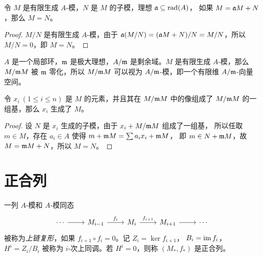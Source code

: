 \begin{corollary}\label{coro:Nakayama}
  令 $M$ 是有限生成 $A$-模，$N$ 是 $M$ 的子模，理想 $\mathfrak{a}\subseteq\operatorname{rad}(A)$，
  如果 $M=\mathfrak{a}M+N$，那么 $M=N$。
\end{corollary}
\begin{proof}
  $M/N$ 是有限生成 $A$-模，由于 $\mathfrak{a}(M/N)=(\mathfrak{a}M+N)/N=M/N$，所以
  $M/N=0$，即 $M=N$。
\end{proof}

$A$ 是一个局部环，$\mathfrak{m}$ 是极大理想，$A/\mathfrak{m}$ 是剩余域。$M$ 是有限生成
$A$-模，那么 $M/\mathfrak{m}M$ 被 $\mathfrak{m}$ 零化，所以 $M/\mathfrak{m}M$ 可以视为
$A/\mathfrak{m}$-模，即一个有限维 $A/\mathfrak{m}$-向量空间。

\begin{proposition}
  令 $x_i\ (1\leq i\leq n)$ 是 $M$ 的元素，并且其在 $M/\mathfrak{m}M$ 中的像组成了
  $M/\mathfrak{m}M$ 的一组基，那么 $x_i$ 生成了 $M$。
\end{proposition}
\begin{proof}
  设 $N$ 是 $x_i$ 生成的子模，由于 $x_i+M/\mathfrak{m} M$ 组成了一组基，
  所以任取 $m\in M$，存在 $a_i\in A$ 使得 $m+\mathfrak{m}M=\sum a_ix_i+\mathfrak{m}M$，
  即 $m\in N+\mathfrak{m}M$，故 $M=\mathfrak{m}M+N$，所以 $M=N$。
\end{proof}

\section{正合列}

一列 $A$-模和 $A$-模同态
\[
  \begin{tikzcd}
    \cdots\arrow[r] & M_{i-1}\arrow[r,"f_i"] & M_i\arrow[r,"f_{i+1}"]
    & M_{i+1}\arrow[r] & \cdots 
  \end{tikzcd}  
\]
被称为\emph{上链复形}，如果 $f_{i+1}\circ f_i=0$。记 $Z_i=\ker f_{i+1}$，
$B_i=\operatorname{im} f_i$，$H^i=Z_{i}/B_i$ 被称为 $i$-次上同调。若 $H^i=0$，则称
$(M_*,f_*)$ 是正合列。


